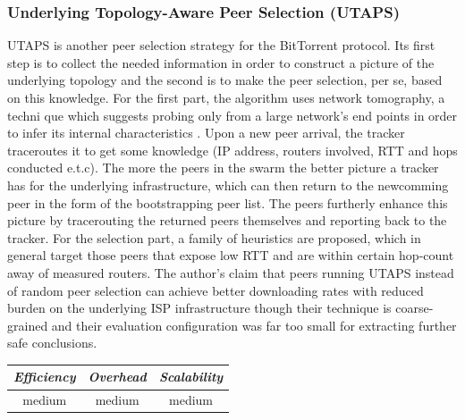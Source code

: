 \subsubsection{Underlying Topology-Aware Peer Selection (UTAPS)}
UTAPS \cite{lcy_utaps_2008} is another peer selection strategy for the
BitTorrent protocol. Its first step is to collect the needed information in
order to construct a picture of the underlying topology and the second is to
make the peer selection, per se, based on this knowledge. For the first part,
the algorithm uses network tomography, a techni  que which suggests probing only
from a large network's end points in order to infer its internal characteristics
\cite{chny_tomography_2002}. Upon a new peer arrival, the tracker traceroutes it
to get some knowledge (IP address, routers involved, RTT and hops conducted
e.t.c). The more the peers in the swarm the better picture a tracker has for the
underlying infrastructure, which can then return to the newcomming peer in the
form of the bootstrapping peer list. The peers furtherly enhance this picture by
tracerouting the returned peers themselves and reporting back to the tracker.
For the selection part, a family of heuristics are proposed, which in general
target those peers that expose low RTT and are within certain hop-count away of
measured routers. The author's claim that peers running UTAPS instead of random
peer selection can achieve better downloading rates with reduced burden on the
underlying ISP infrastructure though their technique is coarse-grained and their
evaluation configuration was far too small for extracting further safe
conclusions.

\begin{center}
\begin{tabular}{ccc}
\emph{Efficiency} & \emph{Overhead} & \emph{Scalability} \\
\hline
medium &
medium &
%
medium
\end{tabular}
\end{center}

